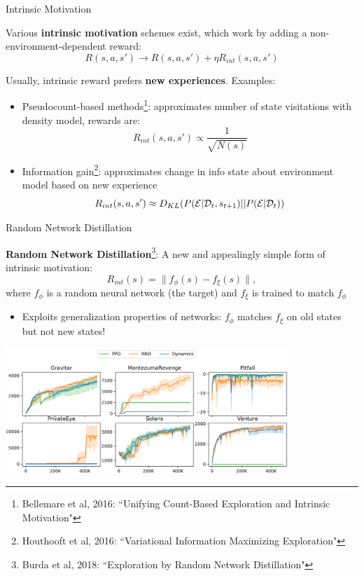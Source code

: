 \documentclass[9pt]{beamer}
\begin{document}
\begin{frame}{Intrinsic Motivation}

Various \textbf{intrinsic motivation} schemes exist, which work by adding a non-environment-dependent reward:
%
\begin{equation*}
R(s,a,s') \to R(s,a,s') + \eta R_{int}(s,a,s')
\end{equation*}

Usually, intrinsic reward prefers \textbf{new experiences}. Examples:
%
\begin{itemize}
\item Pseudocount-based methods\footnote{Bellemare et al, 2016: ``Unifying Count-Based Exploration and Intrinsic Motivation"}: approximates number of state visitations with density model, rewards are:
%
\begin{equation*}
R_{int}(s,a,s') \propto \frac{1}{\sqrt{N(s)}}
\end{equation*}
\item Information gain\footnote{Houthooft et al, 2016: ``Variational Information Maximizing Exploration"}: approximates change in info state about environment model based on new experience
%
\begin{equation*}
R_{int}(s,a,s') \approx D_{KL}(P({\mathcal E}|{\mathcal D}_t,s_{t+1})||P({\mathcal E}|{\mathcal D}_t))
\end{equation*}
\end{itemize}

\end{frame}

\begin{frame}{Random Network Distillation}

\textbf{Random Network Distillation}\footnote{Burda et al, 2018: ``Exploration by Random Network Distillation"}: A new and appealingly simple form of intrinsic motivation:
%
\begin{equation*}
R_{int}(s) = \|f_{\phi}(s) - f_{\xi}(s)\|,
\end{equation*}
%
where $f_{\phi}$ is a random neural network (the target) and $f_{\xi}$ is trained to match $f_{\phi}$

\begin{itemize}
\item Exploits generalization properties of networks: $f_{\phi}$ matches $f_{\xi}$ on old states but not new states!
\end{itemize}


\begin{center}
\includegraphics[width=0.8\textwidth]{p2-rnd-atari}
\end{center}
\end{frame}
\end{document}
